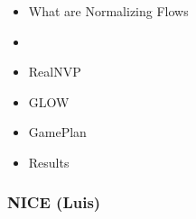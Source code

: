 \begin{frame}
\begin{itemize}
    \item What are Normalizing Flows
    \item \textbf{\color{red}{NICE}}
    \item RealNVP
    \item GLOW
    \item GamePlan
    \item Results
\end{itemize}
\end{frame}

\begin{frame}
    \frametitle{NICE (Luis)}
\end{frame}

